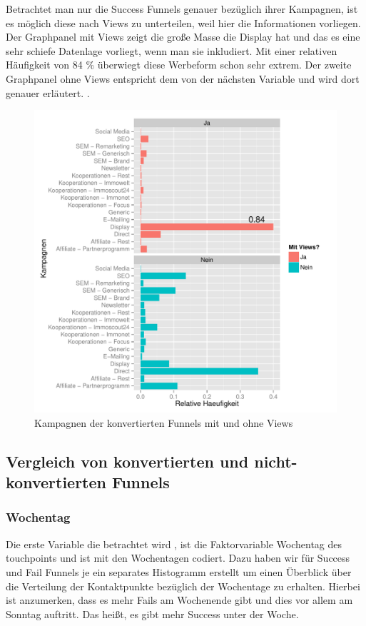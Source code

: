 Betrachtet man nur die Success Funnels genauer bezüglich ihrer Kampagnen, ist es möglich diese nach Views zu unterteilen, weil hier die Informationen vorliegen. Der Graphpanel mit Views zeigt die große Masse die Display hat und das es eine sehr schiefe Datenlage vorliegt, wenn man sie inkludiert. Mit einer relativen Häufigkeit von 84 \% überwiegt diese Werbeform schon sehr extrem. Der zweite Graphpanel ohne Views entspricht dem von der nächsten Variable und wird dort genauer erläutert. \label{campaignSucc}.
\begin{figure}[H]
    \centering
    \includegraphics[scale=0.5]{campaignSucc.pdf}
    \caption{Kampagnen der konvertierten Funnels mit und ohne Views}
    \label{campaignSucc}
\end{figure}

\subsection{Vergleich von konvertierten und nicht-konvertierten Funnels}

\subsubsection*{Wochentag}
Die erste Variable die betrachtet wird , ist die Faktorvariable Wochentag des touchpoints und ist mit den Wochentagen codiert. Dazu haben wir für Success und Fail Funnels je ein separates Histogramm erstellt um einen Überblick über die Verteilung der Kontaktpunkte bezüglich der Wochentage zu erhalten. Hierbei ist anzumerken, dass es mehr Fails am Wochenende gibt und dies vor allem am Sonntag auftritt. Das heißt, es gibt  mehr Success unter der Woche. 

